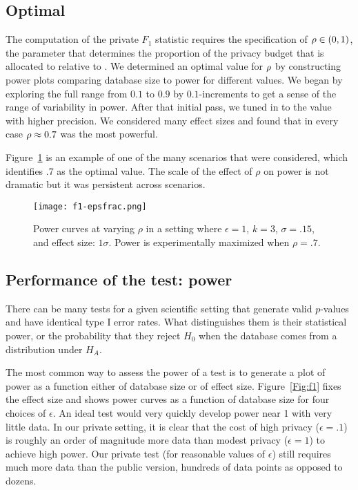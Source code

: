 \subsection{Optimal \epsfrac}\label{subsec:optrho}

The computation of the private $F_1$ statistic requires the specification of $\rho \in (0, 1)$, the parameter that determines the proportion of the privacy budget that is allocated to \sa relative to \se. We determined an optimal value for $\rho$ by constructing power plots comparing database size to power for different \epsfrac values. We began by exploring the full range from $0.1$ to $0.9$ by $0.1$-increments to get a sense of the range of variability in power. After that initial pass, we tuned in to the value with higher precision. We considered many effect sizes and found that in every case $\rho \approx 0.7$ was the most powerful.

Figure~\ref{Fig:f1-epsfrac} is an example of one of the many scenarios that were considered, which identifies .7 as the optimal value. The scale of the effect of $\rho$ on power is not dramatic but it was persistent across scenarios.

\begin{figure}
\centering
\texttt{[image: f1-epsfrac.png]}
\caption{Power curves at varying $\rho$ in a setting where $\epsilon = 1$, $k = 3$, $\sigma = .15$, and effect size: $1\sigma$. Power is experimentally maximized when $\rho = .7$.\label{Fig:f1-epsfrac}}
\end{figure}

\subsection{Performance of the test: power}
\label{subsec:power-analysis}

There can be many tests for a given scientific setting that generate valid $p$-values and have identical type I error rates. What distinguishes them is their statistical power, or the probability that they reject $H_0$ when the database comes from a distribution under $H_A$.

The most common way to assess the power of a test is to generate a plot of power as a function either of database size or of effect size. Figure~\ref{Fig:f1} fixes the effect size and shows power curves as a function of database size for four choices of $\epsilon$. An ideal test would very quickly develop power near 1 with very little data. In our private setting, it is clear that the cost of high privacy ($\epsilon = .1$) is roughly an order of magnitude more data than modest privacy ($\epsilon = 1$) to achieve high power. Our private test (for reasonable values of $\epsilon$) still requires much more data than the public version, hundreds of data points as opposed to dozens.

